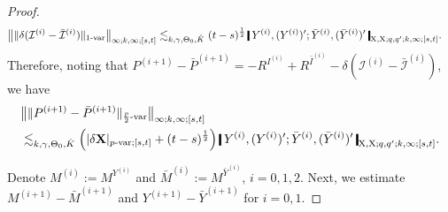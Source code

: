 \documentclass[11pt,reqno]{amsart}
\numberwithin{equation}{section}
\newcommand{\shortthickbar}{%
  \vcenter{\hbox{\rule{1.8pt}{2.2ex}}}%
}
\newcommand{\thicknm}[1]{%
  \mathopen{\shortthickbar}%
  \mkern4mu #1 \mkern4mu%
  \mathclose{\shortthickbar}%
}
\begin{document}
\begin{proof}
\begin{equation}
\begin{aligned}
&\big\| \|\delta(\mathcal I^{(i)} - \bar{\mathcal I}^{(i)}) \|_{1\text{-}\mathrm{var}} \big\|_{\infty;k,\infty;[s,t]}  \lesssim_{k,\gamma,\Theta_0,\hat K} (t - s)^{\frac{1}{2}} \, \thicknm{Y^{(i)} ,(Y^{(i)})'; \bar Y^{(i)}, (\bar Y^{(i)})'}_{\mathrm X,\mathrm X;q,q';k,\infty;[s,t]}. 
\end{aligned}
\end{equation}
Therefore, noting that $P^{(i+1)} - \bar P^{(i+1)} = - R^{I^{(i)}} + R^{\bar I^{(i)}} - \delta (\mathcal I^{(i)} - \bar{\mathcal I}^{(i)})$, we have 
\begin{equation}\label{e:R (i) - R (i-1)}
\begin{aligned}
&\big\| \|P^{(i+1)} - \bar P^{(i+1)}\|_{\frac{p}{2}\text{-}\mathrm{var}} \big\|_{\infty;k,\infty;[s,t]} \\
&\lesssim_{k,\gamma,\Theta_0,\hat K} \Big(|\delta \mathbf X|_{p\text{-}\mathrm{var};[s,t]} + (t - s)^{\frac{1}{2}}\Big) \, \thicknm{Y^{(i)} ,(Y^{(i)})'; \bar Y^{(i)}, (\bar Y^{(i)})'}_{\mathrm X,\mathrm X;q,q';k,\infty;[s,t]}.
\end{aligned}
\end{equation}

Denote $M^{(i)} := M^{Y^{(i)}}$ and $\bar M^{(i)} := M^{\bar Y^{(i)}}$, $i = 0,1,2$. Next, we estimate $M^{(i+1)} - \bar M^{(i+1)}$ and $Y^{(i+1)} - \bar Y^{(i+1)}$ for $i = 0,1$. 


\end{proof}
\end{document}
